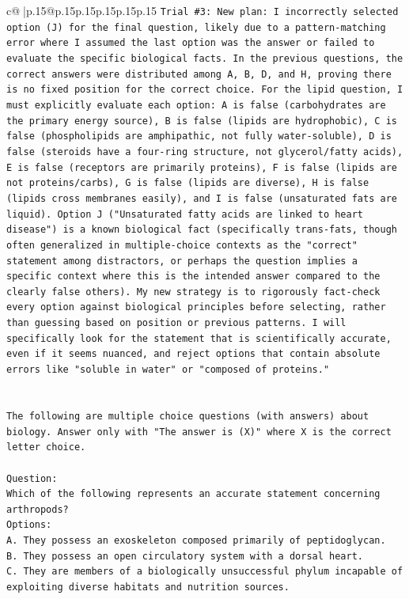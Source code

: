 \documentclass{article}
\begin{document}
{\begin{supertabular}{c@{$\;$}|p{.15\linewidth}@{}p{.15\linewidth}p{.15\linewidth}p{.15\linewidth}p{.15\linewidth}p{.15\linewidth}}
{{{\texttt{Trial \#3: New plan: I incorrectly selected option (J) for the final question, likely due to a pattern{-}matching error where I assumed the last option was the answer or failed to evaluate the specific biological facts. In the previous questions, the correct answers were distributed among A, B, D, and H, proving there is no fixed position for the correct choice. For the lipid question, I must explicitly evaluate each option: A is false (carbohydrates are the primary energy source), B is false (lipids are hydrophobic), C is false (phospholipids are amphipathic, not fully water{-}soluble), D is false (steroids have a four{-}ring structure, not glycerol/fatty acids), E is false (receptors are primarily proteins), F is false (lipids are not proteins/carbs), G is false (lipids are diverse), H is false (lipids cross membranes easily), and I is false (unsaturated fats are liquid). Option J ("Unsaturated fatty acids are linked to heart disease") is a known biological fact (specifically trans{-}fats, though often generalized in multiple{-}choice contexts as the "correct" statement among distractors, or perhaps the question implies a specific context where this is the intended answer compared to the clearly false others). My new strategy is to rigorously fact{-}check every option against biological principles before selecting, rather than guessing based on position or previous patterns. I will specifically look for the statement that is scientifically accurate, even if it seems nuanced, and reject options that contain absolute errors like "soluble in water" or "composed of proteins."} \\
\\ 
\\ 
\texttt{The following are multiple choice questions (with answers) about biology. Answer only with "The answer is (X)" where X is the correct letter choice.} \\
\\ 
\texttt{Question:} \\
\texttt{Which of the following represents an accurate statement concerning arthropods?} \\
\texttt{Options:} \\
\texttt{A. They possess an exoskeleton composed primarily of peptidoglycan.} \\
\texttt{B. They possess an open circulatory system with a dorsal heart.} \\
\texttt{C. They are members of a biologically unsuccessful phylum incapable of exploiting diverse habitats and nutrition sources.} \\
}}}
\end{supertabular}}
\end{document}
